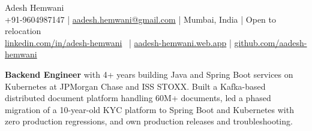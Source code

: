 \documentclass[letterpaper,10pt]{article}
\begin{document}
\begin{center}
    {\color{accent}\Huge Adesh Hemwani } \\ 
    \vspace{2pt}
    {\small\color{subtext} +91-9604987147 |
    \href{mailto:aadesh.hemwani@gmail.com}{aadesh.hemwani@gmail.com} |
    Mumbai, India | 
    Open to relocation }\\
    \vspace{2pt}
    \footnotesize\color{accent}
    \href{https://www.linkedin.com/in/adesh-hemwani/}{linkedin.com/in/adesh-hemwani} \, |
    \href{https://aadesh-hemwani.web.app/}{aadesh-hemwani.web.app} |
    \href{https://github.com/aadesh-hemwani}{github.com/aadesh-hemwani} 
    
\end{center}
\vspace{-2pt}

\textbf{Backend Engineer} \small{with 4+ years building Java and Spring Boot services on Kubernetes at JPMorgan Chase and ISS STOXX. Built a Kafka-based distributed document platform handling 60M+ documents, led a phased migration of a 10-year-old KYC platform to Spring Boot and Kubernetes with zero production regressions, and own production releases and troubleshooting.}
\vspace{-5pt}
\end{document}
